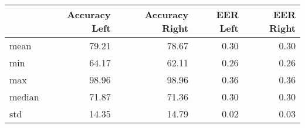 \begin{tabular}{lrrrr}
\toprule
{} &  Accuracy Left &  Accuracy Right &  EER Left &  EER Right \\
\midrule
mean   &          79.21 &           78.67 &      0.30 &       0.30 \\
min    &          64.17 &           62.11 &      0.26 &       0.26 \\
max    &          98.96 &           98.96 &      0.36 &       0.36 \\
median &          71.87 &           71.36 &      0.30 &       0.30 \\
std    &          14.35 &           14.79 &      0.02 &       0.03 \\
\bottomrule
\end{tabular}
